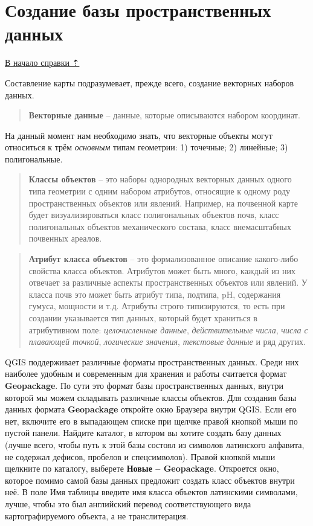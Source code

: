 \documentclass[
  12pt,
]{book}
\begin{document}
\section{Создание базы пространственных данных}\label{digitize-database}

\hyperref[digitize]{В начало справки ⇡}

Составление карты подразумевает, прежде всего, создание векторных наборов данных.

\begin{quote}
\textbf{Векторные данные} -- данные, которые описываются набором координат.
\end{quote}

На данный момент нам необходимо знать, что векторные объекты могут относиться к трём \emph{основным} типам геометрии: 1) точечные; 2) линейные; 3) полигональные.

\begin{quote}
\textbf{Классы объектов} -- это наборы однородных векторных данных одного типа геометрии с одним набором атрибутов, относящие к одному роду пространственных объектов или явлений. Например, на почвенной карте будет визуализироваться класс полигональных объектов почв, класс полигональных объектов механического состава, класс внемасштабных почвенных ареалов.
\end{quote}

\begin{quote}
\textbf{Атрибут класса объектов} -- это формализованное описание какого-либо свойства класса объектов. Атрибутов может быть много, каждый из них отвечает за различные аспекты пространственных объектов или явлений. У класса почв это может быть атрибут типа, подтипа, pH, содержания гумуса, мощности и т.д. Атрибуты строго типизируются, то есть при создании указывается тип данных, который будет храниться в атрибутивном поле: \emph{целочисленные данные}, \emph{действительные числа}, \emph{числа с плавающей точкой}, \emph{логические значения}, \emph{текстовые данные} и ряд других.
\end{quote}

QGIS поддерживает различные форматы пространственных данных. Среди них наиболее удобным и современным для хранения и работы считается формат \textbf{Geopackage}. По сути это формат базы пространственных данных, внутри которой мы можем складывать различные классы объектов. Для создания базы данных формата \textbf{Geopackage} откройте окно Браузера внутри QGIS. Если его нет, включите его в выпадающем списке при щелчке правой кнопкой мыши по пустой панели. Найдите каталог, в котором вы хотите создать базу данных (лучше всего, чтобы путь к этой базы состоял из символов латинского алфавита, не содержал дефисов, пробелов и спецсимволов). Правой кнопкой мыши щелкните по каталогу, выберете \textbf{Новые -- Geopackage}. Откроется окно, которое помимо самой базы данных предложит создать класс объектов внутри неё. В поле Имя таблицы введите имя класса объектов латинскими символами, лучше, чтобы это был английский перевод соответствующего вида картографируемого объекта, а не транслитерация.
\end{document}
